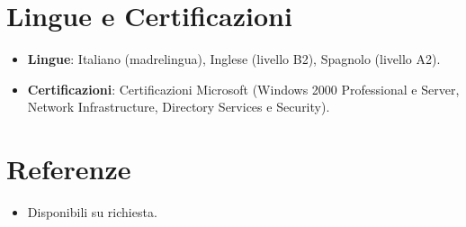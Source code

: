 \documentclass[11pt,a4paper,sans]{moderncv}
\begin{document}

\section{Lingue e Certificazioni}
\vspace{1pt}
\begin{itemize}
\item \textbf{Lingue}: Italiano (madrelingua), Inglese (livello B2), Spagnolo (livello A2).
\item \textbf{Certificazioni}: Certificazioni Microsoft (Windows 2000 Professional e Server, Network Infrastructure, Directory Services e Security).
\end{itemize}


\section{Referenze}
\vspace{1pt}
\begin{itemize}
\item Disponibili su richiesta.
\end{itemize}
\end{document}
